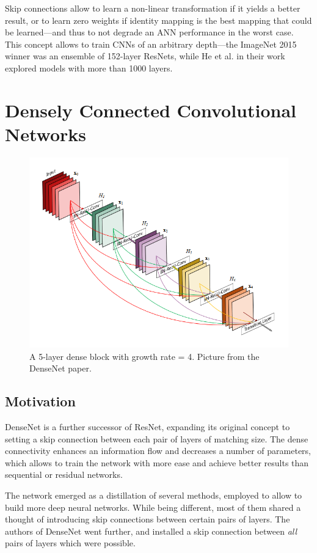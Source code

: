 \documentclass[thesis=B,english]{FITthesis}[2019/12/23]
\begin{document}
Skip connections allow to learn a non-linear transformation if it yields a better result, or to learn zero weights if identity mapping is the best mapping that could be learned---and thus to not degrade an ANN performance in the worst case. This concept allows to train CNNs of an arbitrary depth---the ImageNet 2015 winner was an ensemble of 152-layer ResNets, while He et al. in their work explored models with more than 1000 layers.

\section{Densely Connected Convolutional Networks}

\begin{figure}[h]
	\centering
	\includegraphics[scale=0.66]{images/dense_block.png}
	\caption{A 5-layer dense block with growth rate = 4. Picture from the DenseNet paper\cite{densenet}.}
\end{figure}

\subsection{Motivation}

DenseNet\cite{densenet} is a further successor of ResNet, expanding its original concept to setting a skip connection between each pair of layers of matching size. The dense connectivity enhances an information flow and decreases a number of parameters, which allows to train the network with more ease and achieve better results than sequential or residual networks. 

The network emerged as a distillation of several methods\cite{resnet}\cite{stochastic_depth}\cite{highway_net}, employed to allow to build more deep neural networks. While being different, most of them shared a thought of introducing skip connections between certain pairs of layers. The authors of DenseNet went further, and installed a skip connection between \textit{all} pairs of layers which were possible.
\end{document}
